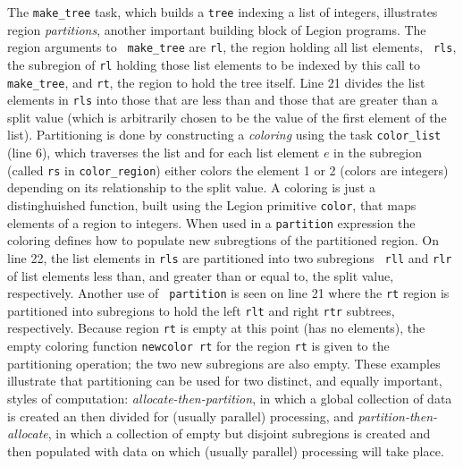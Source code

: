 The {\tt make\_tree} task, which builds a {\tt tree} indexing a list
of integers, illustrates region {\em partitions}, another important
building block of Legion programs.  The region arguments to {\tt
make\_tree} are {\tt rl}, the region holding all list elements, {\tt
rls}, the subregion of {\tt rl} holding those list elements to be
indexed by this call to {\tt make\_tree}, and {\tt rt}, the region to
hold the tree itself.  Line 21 divides the list elements in {\tt rls}
into those that are less than and those that are greater than a split
value (which is arbitrarily chosen to be the value of the first
element of the list).  Partitioning is done by constructing a {\em
coloring} using the task {\tt color\_list} (line 6), which traverses the list
and for each list element $e$ in the subregion (called {\tt rs} in
{\tt color\_region}) either colors the element 1 or 2 (colors are
integers) depending on its relationship to the split value.  A
coloring is just a distinghuished function, built using the Legion
primitive {\tt color}, that maps elements of a region to integers.
When used in a {\tt partition} expression the coloring defines how to
populate new subregtions of the partitioned region.  On line 22, the
list elements in {\tt rls} are partitioned into two subregions {\tt
rll} and {\tt rlr} of list elements less than, and greater than or
equal to, the split value, respectively.  Another use of {\tt
partition} is seen on line 21 where the {\tt rt} region is partitioned
into subregions to hold the left {\tt rlt} and right {\tt rtr}
subtrees, respectively.  Because region {\tt rt} is empty at this
point (has no elements), the empty coloring function {\tt newcolor rt}
for the region {\tt rt} is given to the partitioning operation; the
two new subregions are also empty.  These examples illustrate that
partitioning can be used for two distinct, and equally important,
styles of computation: {\em allocate-then-partition}, in which a
global collection of data is created an then divided for
(usually parallel) processing, and {\em partition-then-allocate}, in
which a collection of empty but disjoint subregions is created and
then populated with data on which (usually parallel) processing will
take place.

